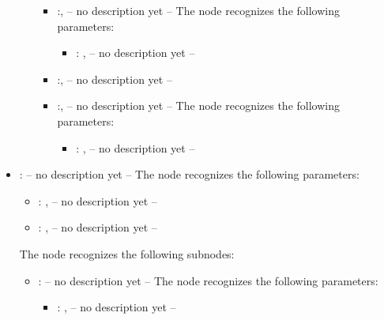 \begin{itemize}
\begin{itemize}
\begin{itemize}
            \item {}:, 
              -- no description yet --
              The  node recognizes the following parameters:
                \begin{itemize}
                  \item {}: , 
                    -- no description yet --
              \end{itemize}

            \item {}:, 
              -- no description yet --

            \item {}:, 
              -- no description yet --
              The  node recognizes the following parameters:
                \begin{itemize}
                  \item {}: , 
                    -- no description yet --
              \end{itemize}
          \end{itemize}
      \end{itemize}

    \item {}:
      -- no description yet --
      The  node recognizes the following parameters:
        \begin{itemize}
          \item {}: , 
            -- no description yet --
          \item {}: , 
            -- no description yet --
      \end{itemize}

      The  node recognizes the following subnodes:
      \begin{itemize}
        \item {}:
          -- no description yet --
          The  node recognizes the following parameters:
            \begin{itemize}
              \item {}: , 
                -- no description yet --
          \end{itemize}


\end{itemize}
\end{itemize}
